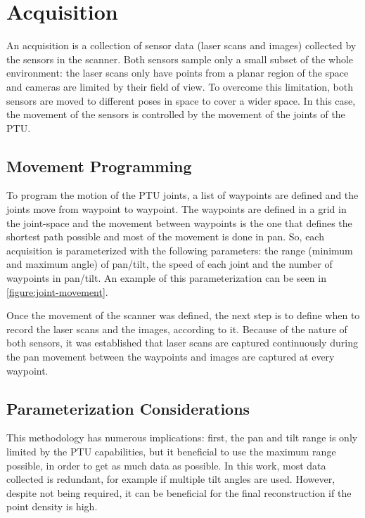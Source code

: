 \section{Acquisition}
\label{section:acquisition}

An acquisition is a collection of sensor data (laser scans and images) collected by the sensors in the scanner. Both sensors sample only a small subset of the whole environment: the laser scans only have points from a planar region of the space and cameras are limited by their field of view. To overcome this limitation, both sensors are moved to different poses in space to cover a wider space. In this case, the movement of the sensors is controlled by the movement of the joints of the PTU. 

\subsection{Movement Programming}

To program the motion of the PTU joints, a list of waypoints are defined and the joints move from waypoint to waypoint. The waypoints are defined in a grid in the joint-space and the movement between waypoints is the one that defines the shortest path possible and most of the movement is done in pan. So, each acquisition is parameterized with the following parameters: the range (minimum and maximum angle) of pan/tilt, the speed of each joint and the number of waypoints in pan/tilt. An example of this parameterization can be seen in \cref{figure:joint-movement}.

Once the movement of the scanner was defined, the next step is to define when to record the laser scans and the images, according to it. Because of the nature of both sensors, it was established that laser scans are captured continuously during the pan movement between the waypoints and images are captured at every waypoint.



\subsection{Parameterization Considerations}

This methodology has numerous implications: first, the pan and tilt range is only limited by the PTU capabilities, but it beneficial to use the maximum range possible, in order to get as much data as possible. In this work, most data collected is redundant, for example if multiple tilt angles are used. However, despite not being required, it can be beneficial for the final reconstruction if the point density is high.

